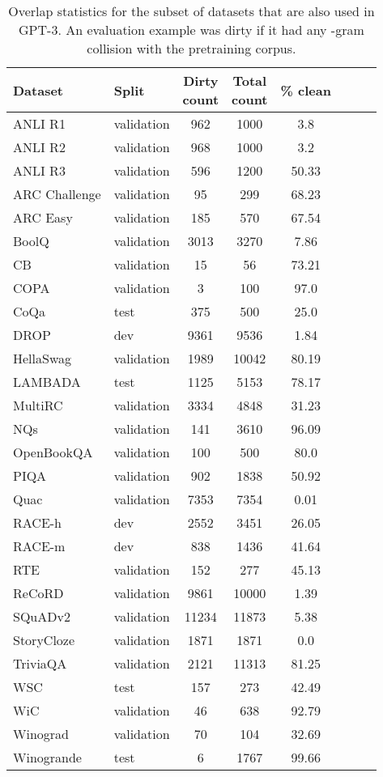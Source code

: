 \documentclass{article}
\begin{document}
\begin{table}[t]
    \centering
    \small
    \caption{
Overlap statistics for the subset of datasets that are also used in GPT-3. An evaluation example was dirty if it had any -gram collision with the pretraining corpus.
}
\label{tab:data_contamination}
\vskip 0.1in
    \begin{tabular}{ll cc cc cc}
    \toprule
    Dataset & Split &  \makecell[c]{Dirty \\ count} & \makecell[c]{Total \\ count} & \% clean \\
    \midrule
    ANLI R1 & validation & 962 & 1000 & 3.8 \\
    ANLI R2 & validation & 968 & 1000 & 3.2 \\
    ANLI R3 & validation & 596 & 1200 & 50.33 \\
    ARC Challenge & validation & 95 & 299 & 68.23 \\
    ARC Easy & validation & 185 & 570 & 67.54 \\
    BoolQ & validation & 3013 & 3270 & 7.86 \\
    CB & validation & 15 & 56 & 73.21 \\
    COPA & validation & 3 & 100 & 97.0 \\
    CoQa & test & 375 & 500 & 25.0 \\
    DROP & dev & 9361 & 9536 & 1.84 \\
    HellaSwag & validation & 1989 & 10042 & 80.19 \\
    LAMBADA & test & 1125 & 5153 & 78.17 \\
    MultiRC & validation & 3334 & 4848 & 31.23 \\
    NQs & validation & 141 & 3610 & 96.09 \\
    OpenBookQA & validation & 100 & 500 & 80.0 \\
    PIQA & validation & 902 & 1838 & 50.92 \\
    Quac & validation & 7353 & 7354 & 0.01 \\
    RACE-h & dev & 2552 & 3451 & 26.05 \\
    RACE-m & dev & 838 & 1436 & 41.64 \\
    RTE & validation & 152 & 277 & 45.13 \\
    ReCoRD & validation & 9861 & 10000 & 1.39 \\
    SQuADv2 & validation & 11234 & 11873 & 5.38 \\
    StoryCloze & validation & 1871 & 1871 & 0.0 \\
    TriviaQA & validation & 2121 & 11313 & 81.25 \\
    WSC & test & 157 & 273 & 42.49 \\
    WiC & validation & 46 & 638 & 92.79 \\
    Winograd & validation & 70 & 104 & 32.69 \\
    Winogrande & test & 6 & 1767 & 99.66 \\
    \bottomrule
    \end{tabular}

\end{table}
\end{document}
